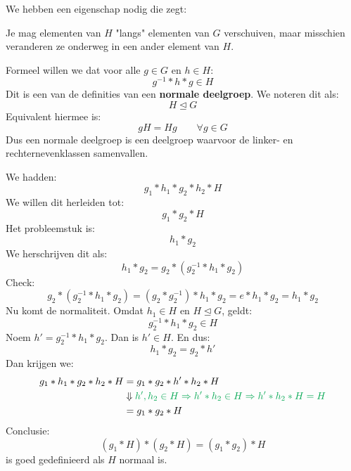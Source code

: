
We hebben een eigenschap nodig die zegt:
\begin{barbox}[PineGreen]
    Je mag elementen van $H$ "langs" elementen van $G$ verschuiven, maar misschien veranderen ze onderweg in een ander element van $H$.
\end{barbox}

Formeel willen we dat voor alle $g \in G$ en $h \in H$:
\begin{equation*}
    g^{-1} * h * g \in H
\end{equation*}
Dit is een van de definities van een \textbf{normale deelgroep}. We noteren dit als:
\begin{equation*}
    H \trianglelefteq G
\end{equation*}
Equivalent hiermee is:
\begin{equation*}
    gH = Hg \qquad \forall g \in G
\end{equation*}
Dus een normale deelgroep is een deelgroep waarvoor de linker- en rechternevenklassen samenvallen.


We hadden:
\begin{equation*}
    g_1 * h_1 * g_2 * h_2 * H
\end{equation*}
We willen dit herleiden tot:
\begin{equation*}
    g_1 * g_2 * H
\end{equation*}
Het probleemstuk is:
\begin{equation*}
    h_1 * g_2
\end{equation*}
We herschrijven dit als:
\begin{equation*}
    h_1 * g_2 = g_2 * (g_2^{-1} * h_1 * g_2)
\end{equation*}
Check:
\begin{equation*}
    g_2 * (g_2^{-1} * h_1 * g_2) = (g_2 * g_2^{-1}) * h_1 * g_2 = e * h_1 * g_2 = h_1 * g_2
\end{equation*}
Nu komt de normaliteit. Omdat $h_1 \in H$ en $H \trianglelefteq G$, geldt:
\begin{equation*}
    g_2^{-1} * h_1 * g_2 \in H
\end{equation*}
Noem $h' = g_2^{-1} * h_1 * g_2$. Dan is $h' \in H$. En dus:
\begin{equation*}
    h_1 * g_2 = g_2 * h'
\end{equation*}
Dan krijgen we:
\begin{equation*}
    \begin{aligned}
        g_1 * h_1 * g_2 * h_2 * H &= g_1 * g_2 * h' * h_2 * H \\
        &\Downarrow \textcolor{Green}{ h',h_2 \in H \Rightarrow h' * h_2 \in H \Rightarrow h'* h_2 * H = H} \\
        &= g_1 * g_2 * H
    \end{aligned}
\end{equation*}
Conclusie:
\begin{equation*}
    (g_1 * H) * (g_2 * H) = (g_1 * g_2) * H
\end{equation*}
is goed gedefinieerd als $H$ normaal is.

